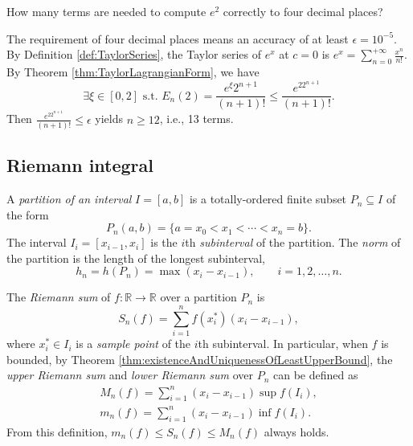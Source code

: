 \begin{exm}
  \label{exm:approximatingExponentialFunction}
  How many terms are needed to compute $e^2$ correctly to four decimal
  places?

  The requirement of four decimal places means
  an accuracy of at least $\epsilon=10^{-5}$.
By Definition \ref{def:TaylorSeries}, 
   the Taylor series of $e^x$ at $c=0$ is
  $
    e^x = \sum_{n=0}^{+\infty}\frac{x^n}{n!}.
  $
  By Theorem \ref{thm:TaylorLagrangianForm}, we have
  \begin{equation*}
    \exists \xi\in [0,2] \text{ s.t. }
    E_n(2)=\frac{e^{\xi}2^{n+1}}{(n+1)!} \le \frac{e^22^{n+1}}{(n+1)!}.
  \end{equation*}
  Then $\frac{e^22^{n+1}}{(n+1)!}\le \epsilon$ yields $n\ge 12$, i.e., 13 terms.
\end{exm}


\subsection{Riemann integral}
\label{sec:RiemannIntegral}

\begin{defn}
  \label{def:partitionOfInterval}
  A \emph{partition of an interval} $I=[a, b]$
  is a totally-ordered finite subset $P_n\subseteq I$ of the form
  \begin{equation}
    \label{eq:partition}
    P_n(a,b) = \{a=x_0 < x_1 < \cdots < x_n=b\}.
  \end{equation}
  The interval $I_i=[x_{i-1}, x_{i}]$ is the $i$th
   \emph{subinterval} of the partition.
  The \emph{norm} of the partition
  is the length of the longest subinterval,
  \begin{equation}
    \label{eq:normOfPartition}
    h_n= h(P_n) = \max(x_i-x_{i-1}),\qquad i=1, 2, \ldots, n.
  \end{equation}
\end{defn}

\begin{defn}
  \label{def:RiemannSum}
  The \emph{Riemann sum} of %
  $f: \mathbb{R}\rightarrow \mathbb{R}$
  over a partition $P_n$ is
  \begin{equation}
    \label{eq:RiemannSum}
    S_n(f) = \sum_{i=1}^n f(x_i^*) (x_{i}-x_{i-1}),
  \end{equation}
  where $x_i^*\in I_i$ 
  is a \emph{sample point} %
  of the $i$th subinterval.
  In particular, when $f$ is bounded,
  by Theorem \ref{thm:existenceAndUniquenessOfLeastUpperBound},
  the \emph{upper Riemann sum}
  and \emph{lower Riemann sum} over $P_n$ can be defined as
  \begin{align}
    \label{eq:upperRiemannSum}
    M_n(f) = \sum_{i=1}^n (x_{i}-x_{i-1}) \sup f(I_i), 
    \\
    \label{eq:lowerRiemannSum}
    m_n(f) = \sum_{i=1}^n (x_{i}-x_{i-1}) \inf f(I_i). 
  \end{align}
  From this definition, $m_{n}(f)\le S_{n}(f)\le M_{n}(f)$ always holds.
\end{defn}

